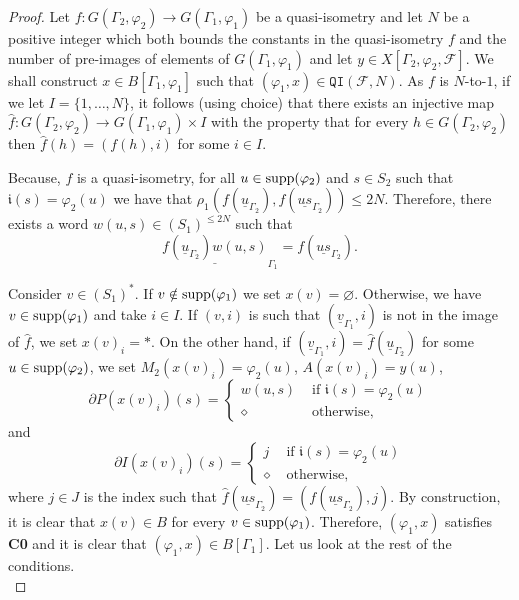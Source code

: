 \documentclass{article}
\theoremstyle{definition}
\theoremstyle{definition}
\newcommand{\Fo}{\mathcal{F}}
\newcommand{\init}{\mathfrak{i}}
\newcommand{\QI}{\mathtt{QI}}
\newcommand{\supp}{\textnormal{supp}}
\begin{document}
\begin{proof}
     Let $f\colon G(\Gamma_2,\varphi_2)\to G(\Gamma_1, \varphi_1)$ be a quasi-isometry and let $N$ be a positive integer which both bounds the constants in the quasi-isometry $f$ and the number of pre-images of elements of $G(\Gamma_1, \varphi_1)$ and let $y\in X[\Gamma_2, \varphi_2, \Fo]$. We shall construct $x \in B[\Gamma_1, {\varphi_1}]$ such that $(\varphi_1,x) \in \QI(\Fo,N)$.
    As $f$ is $N$-to-$1$, if we let $I = \{1,\dots,N\}$, it follows (using choice) that there exists an injective map $\widehat{f}\colon G(\Gamma_2,\varphi_2) \to G(\Gamma_1,\varphi_1)\times I$ with the property that for every $h\in G(\Gamma_2, \varphi_2)$ then $\widehat{f}(h) = (f(h),i)$ for some $i \in I$.

    Because, $f$ is a quasi-isometry, for all $u\in\supp(\varphi_2)$ and $s\in S_2$ such that $\init(s) = \varphi_2(u)$ we have that $\rho_1(f(\underline{u}_{\Gamma_2}), f(\underline{us}_{\Gamma_2})) \leq 2N$. Therefore, there exists a word $w(u,s)\in (S_1)^{\leq 2N}$ such that \[\underline{f(\underline{u}_{\Gamma_2})w(u,s)}_{\Gamma_1} = f(\underline{us}_{\Gamma_2}).\]

    Consider $v \in (S_1)^*$. If $v \notin \supp(\varphi_1)$ we set $x(v)=\varnothing$. Otherwise, we have 
    $v\in \supp(\varphi_1)$ and take $i \in I$. If $(v,i)$ is such that $(\underline{v}_{\Gamma_1},i)$ is not in the image of $\widehat{f}$, we set $x(v)_i = \ast$. On the other hand, if $(\underline{v}_{\Gamma_1},i) = \widehat{f}(\underline{u}_{\Gamma_2})$ for some $u \in \supp(\varphi_2)$, we set $M_2(x(v)_i) = \varphi_2(u)$, $A(x(v)_i) = y(u)$, 
    $$\partial P(x(v)_i)(s) = \begin{cases}
        w(u,s) & \mbox{ if } \init(s) = \varphi_2(u) \\
        \diamond & \mbox{ otherwise},
    \end{cases}$$
    and
    $$\partial I(x(v)_i)(s) = \begin{cases}
        j & \mbox{ if } \init(s) = \varphi_2(u) \\
        \diamond & \mbox{ otherwise},
    \end{cases}$$
    where $j \in J$ is the index such that $\widehat{f}(\underline{us}_{\Gamma_2}) = (f(\underline{us}_{\Gamma_2}), j)$. By construction, it is clear that $x(v)\in B$ for every $v\in \supp(\varphi_1)$. Therefore, $(\varphi_1, x)$ satisfies \textbf{C0} and it is clear that $(\varphi_1, x) \in B[\Gamma_1]$. Let us look at the rest of the conditions.\\


\end{proof}
\end{document}

